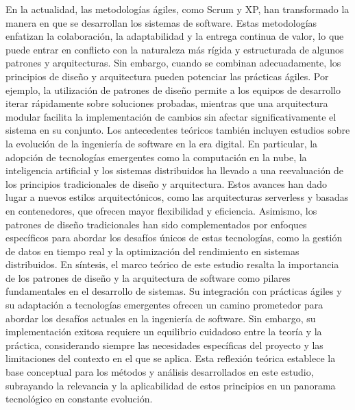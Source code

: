 \documentclass[conference]{IEEEtran}
\begin{document}
En la actualidad, las metodologías ágiles, como Scrum y XP, han transformado la manera en que se desarrollan los sistemas de software. Estas metodologías enfatizan la colaboración, la adaptabilidad y la entrega continua de valor, lo que puede entrar en conflicto con la naturaleza más rígida y estructurada de algunos patrones y arquitecturas. Sin embargo, cuando se combinan adecuadamente, los principios de diseño y arquitectura pueden potenciar las prácticas ágiles. Por ejemplo, la utilización de patrones de diseño permite a los equipos de desarrollo iterar rápidamente sobre soluciones probadas, mientras que una arquitectura modular facilita la implementación de cambios sin afectar significativamente el sistema en su conjunto.
Los antecedentes teóricos también incluyen estudios sobre la evolución de la ingeniería de software en la era digital. En particular, la adopción de tecnologías emergentes como la computación en la nube, la inteligencia artificial y los sistemas distribuidos ha llevado a una reevaluación de los principios tradicionales de diseño y arquitectura. Estos avances han dado lugar a nuevos estilos arquitectónicos, como las arquitecturas serverless y basadas en contenedores, que ofrecen mayor flexibilidad y eficiencia. Asimismo, los patrones de diseño tradicionales han sido complementados por enfoques específicos para abordar los desafíos únicos de estas tecnologías, como la gestión de datos en tiempo real y la optimización del rendimiento en sistemas distribuidos.
En síntesis, el marco teórico de este estudio resalta la importancia de los patrones de diseño y la arquitectura de software como pilares fundamentales en el desarrollo de sistemas. Su integración con prácticas ágiles y su adaptación a tecnologías emergentes ofrecen un camino prometedor para abordar los desafíos actuales en la ingeniería de software. Sin embargo, su implementación exitosa requiere un equilibrio cuidadoso entre la teoría y la práctica, considerando siempre las necesidades específicas del proyecto y las limitaciones del contexto en el que se aplica. Esta reflexión teórica establece la base conceptual para los métodos y análisis desarrollados en este estudio, subrayando la relevancia y la aplicabilidad de estos principios en un panorama tecnológico en constante evolución.
\end{document}
